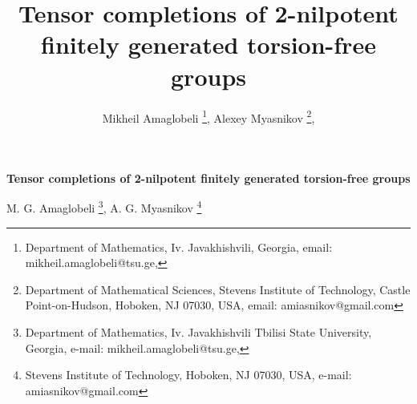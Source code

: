 \documentclass[11pt]{article}
\gdef\firstpage{1}
\theoremstyle{definition}
\begin{document}
\setcounter{page}{\firstpage}
\pagestyle{newpstyle}

\sloppy
\rm


\begin{center}
    {\Large
   \textbf{Tensor completions of 2-nilpotent finitely generated torsion-free groups} \newline

   M. G. Amaglobeli \footnote {Department of Mathematics, Iv. Javakhishvili Tbilisi State University, Georgia, e-mail: mikheil.amaglobeli@tsu.ge,}, A. G. Myasnikov \footnote {Stevens Institute of Technology, Hoboken, NJ 07030, USA, e-mail: amiasnikov@gmail.com}} \newline

\end{center}

\title {Tensor completions of 2-nilpotent finitely generated torsion-free groups%
}

\author {Mikheil Amaglobeli \footnote {Department of Mathematics, Iv. Javakhishvili, Georgia, email: mikheil.amaglobeli@tsu.ge,}, Alexey Myasnikov \footnote {Department of Mathematical Sciences, Stevens Institute of Technology, Castle Point-on-Hudson, Hoboken, NJ 07030, USA, email: amiasnikov@gmail.com},}

\end{document}
